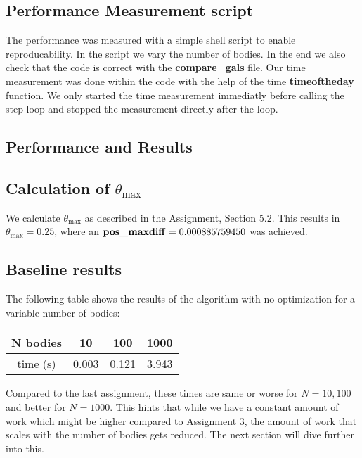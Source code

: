 \documentclass[a4paper]{scrartcl}
\begin{document}
    \subsection{Performance Measurement script}
        The performance was measured with a simple shell script to enable
        reproducability. In the script we vary the number of bodies. In the end
        we also check that the code is correct with the \textbf{compare\_gals} file. Our
        time measurement was done within the code with the help of the time
        \textbf{timeoftheday} function. We only started the time measurement
        immediatly before calling the step loop and stopped the measurement
        directly after the loop.

    \subsection{Performance and Results}

        \subsection{Calculation of $\theta_{\max}$}
        
            We calculate $\theta_{\max}$ as described in the Assignment, Section
            5.2. This results in $\theta_{\max} = 0.25$, where an $\text{\textbf{pos\_maxdiff}}
            = 0.000885759450$ was achieved.

        \subsection{Baseline results}\label{sec:Baseline}
            The following table shows the results of the algorithm with no
            optimization for a variable number of bodies:
            \noindent\begin{tabular}{c|c|c|c}
                N bodies & 10 & 100 & 1000 \\
                \hline
                time (s) & 0.003 & 0.121 & 3.943\\
            \end{tabular}

            Compared to the last assignment, these times are same or worse for
            $N=10, 100$ and better for $N=1000$. This hints that while we have a
            constant amount of work which might be higher compared to Assignment
            3, the amount of work that scales with the number of bodies gets
            reduced. The next section will dive further into this.
\end{document}
